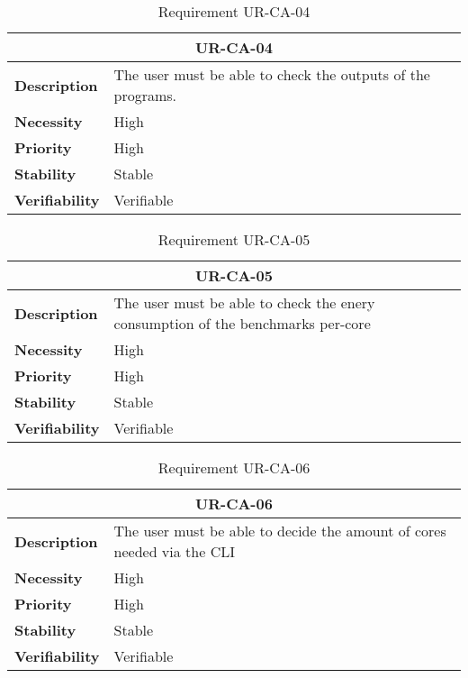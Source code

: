 \begin{table}[H]
    \centering
    \begin{tabular}{l p{10cm}}
        \toprule
        \multicolumn{2}{c}{UR-CA-04} \\
        \toprule
        \textbf{Description}        & The user must be able to check the outputs of the programs. \\
        \textbf{Necessity}          & High   \\
        \textbf{Priority}           & High   \\
        \textbf{Stability}          & Stable \\
        \textbf{Verifiability}      & Verifiable \\
    \end{tabular}
    \caption{Requirement UR-CA-04}
    \label{tab:ur-ca-04}
\end{table}

\begin{table}[H]
    \centering
    \begin{tabular}{l p{10cm}}
        \toprule
        \multicolumn{2}{c}{UR-CA-05} \\
        \toprule
        \textbf{Description}        & The user must be able to check the enery consumption of the benchmarks per-core\\
        \textbf{Necessity}          & High   \\
        \textbf{Priority}           & High   \\
        \textbf{Stability}          & Stable \\
        \textbf{Verifiability}      & Verifiable \\
    \end{tabular}
    \caption{Requirement UR-CA-05}
    \label{tab:ur-ca-05}
\end{table}

\begin{table}[H]
    \centering
    \begin{tabular}{l p{10cm}}
        \toprule
        \multicolumn{2}{c}{UR-CA-06} \\
        \toprule
        \textbf{Description}        & The user must be able to decide the amount of cores needed via the CLI\\
        \textbf{Necessity}          & High   \\
        \textbf{Priority}           & High   \\
        \textbf{Stability}          & Stable \\
        \textbf{Verifiability}      & Verifiable \\
    \end{tabular}
    \caption{Requirement UR-CA-06}
    \label{tab:ur-ca-06}
\end{table}

